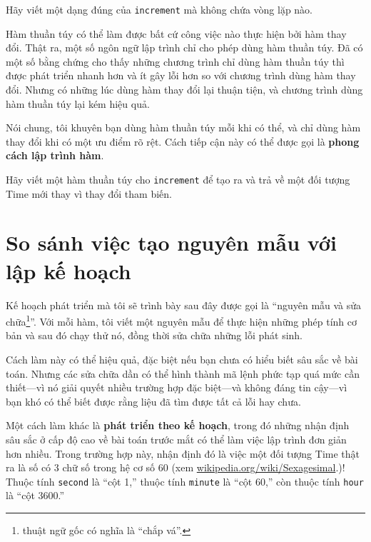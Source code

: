 \documentclass[11pt]{book}
\begin{document}
\begin{ex}
Hãy viết một dạng đúng của {\tt increment} mà 
không chứa vòng lặp nào.
\end{ex}

Hàm thuần túy có thể làm được bất cứ công việc nào thực hiện bởi
hàm thay đổi. Thật ra, một số ngôn ngữ lập trình chỉ cho phép dùng
hàm thuần túy. Đã có một số bằng chứng cho thấy những chương trình 
chỉ dùng hàm thuần túy thì được phát triển nhanh hơn và ít gây lỗi hơn
so với chương trình dùng hàm thay đổi. Nhưng có những lúc dùng hàm
thay đổi lại thuận tiện, và chương trình dùng hàm thuần túy lại kém hiệu quả.

Nói chung, tôi khuyên bạn dùng hàm thuần túy mỗi khi có thể, và chỉ
dùng hàm thay đổi khi có một ưu điểm rõ rệt. Cách tiếp cận này
có thể được gọi là {\bf phong cách lập trình hàm}.



\begin{ex}
Hãy viết một hàm thuần túy cho {\tt increment} để tạo ra và trả về
một đối tượng Time mới thay vì thay đổi tham biến.
\end{ex}


\section{So sánh việc tạo nguyên mẫu với lập kế hoạch}
\label{prototype}


Kế hoạch phát triển mà tôi sẽ trình bày sau đây được gọi là ``nguyên mẫu
và sửa chữa\footnote{thuật ngữ gốc có nghĩa là ``chắp vá''.}''. Với mỗi hàm, tôi viết một nguyên mẫu để thực hiện những
phép tính cơ bản và sau đó chạy thử nó, đồng thời sửa chữa những lỗi
phát sinh.

Cách làm này có thể hiệu quả, đặc biệt nếu bạn chưa có hiểu biết sâu sắc
về bài toán. Nhưng các sửa chữa dần có thể hình thành mã lệnh phức tạp
quá mức cần thiết---vì nó giải quyết nhiều trường hợp đặc biệt---và 
không đáng tin cậy---vì bạn khó có thể biết được rằng liệu đã tìm được
tất cả lỗi hay chưa.

Một cách làm khác là {\bf phát triển theo kế hoạch}, trong đó những
nhận định sâu sắc ở cấp độ cao về bài toán trước mắt có thể làm việc
lập trình đơn giản hơn nhiều. Trong trường hợp này, nhận định đó là
việc một đối tượng Time thật ra là số có 3 chữ số trong hệ cơ số 60
(xem \url{wikipedia.org/wiki/Sexagesimal}.)!  Thuộc tính
{\tt second} là ``cột 1,'' thuộc tính {\tt minute}
là ``cột 60,'' còn thuộc tính {\tt hour} là
``cột 3600.''
\end{document}
